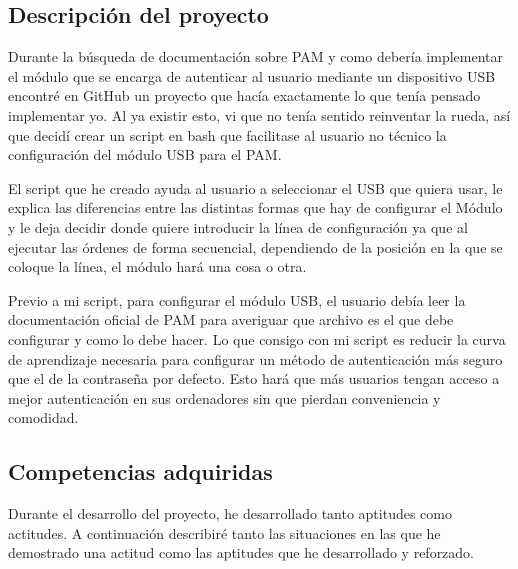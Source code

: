 \documentclass[titlepage, 12pt, a4paper]{article}
\begin{document}
\subsection{Descripción del proyecto}
Durante la búsqueda de documentación sobre \Gls{PAM} y como debería implementar el módulo que se encarga de autenticar al usuario mediante
un dispositivo \Gls{USB} encontré en \Gls{GitHub} un proyecto que hacía exactamente lo que tenía pensado implementar yo. Al ya existir esto, vi que no tenía sentido reinventar la rueda, así que decidí crear un \Gls{script} en \Gls{bash} que facilitase al usuario no técnico la configuración del módulo \Gls{USB} para el \Gls{PAM}.\par
El \Gls{script} que he creado ayuda al usuario a seleccionar el \Gls{USB} que quiera usar, le explica las diferencias entre las distintas formas que hay de configurar el Módulo y le deja decidir donde quiere introducir la línea de configuración ya que al ejecutar las órdenes de forma secuencial, dependiendo de la posición en la que se coloque la línea, el módulo hará una cosa o otra. \par
Previo a mi \Gls{script}, para configurar el módulo \Gls{USB}, el usuario debía leer la documentación oficial de PAM para averiguar que archivo es el que debe configurar y como lo debe hacer. Lo que consigo con mi \Gls{script} es reducir la curva de aprendizaje necesaria para configurar un método de autenticación más seguro que el de la contraseña por defecto. Esto hará que más usuarios tengan acceso a mejor autenticación en sus ordenadores sin que pierdan conveniencia y comodidad.
\subsection{Competencias adquiridas}
Durante el desarrollo del proyecto, he desarrollado tanto aptitudes como actitudes. A continuación describiré tanto las situaciones en las que he demostrado una actitud como las aptitudes que he desarrollado y reforzado.
\end{document}
